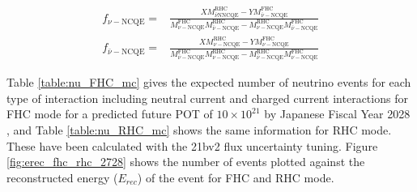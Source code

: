 \begin{equation}
    \begin{aligned}
    f_{\nu-\mathrm{NCQE}}= & \frac{X M_{\bar{\nu} \mathrm{N} \mathrm{NCQE}}^{\mathrm{RHC}}-Y M_{\bar{\nu}-\mathrm{NCQE}}^{\mathrm{FHC}}}{M_{\nu-\mathrm{NCQE}}^{\mathrm{FHC}} M_{\bar{\nu}-\mathrm{NCQE}}^{\mathrm{RHC}}-M_{\nu-\mathrm{NCQE}}^{\mathrm{RHC}} M_{\bar{\nu}-\mathrm{NCQE}}^{\mathrm{FHC}}} \\
    f_{\bar{\nu}-\mathrm{NCQE}}= & \frac{X M_{\nu-\mathrm{NCQE}}^{\mathrm{RHC}}-Y M_{\nu-\mathrm{NCQE}}^{\mathrm{FHC}}}{M_{\bar{\nu}-\mathrm{NCQE}}^{\mathrm{FHC}} M_{\nu-\mathrm{NCQE}}^{\mathrm{RHC}}-M_{\bar{\nu}-\mathrm{NCQE}}^{\mathrm{RHC}} M_{\nu-\mathrm{NCQE}}^{\mathrm{FHC}}}
    \end{aligned}
\label{eq:scale_factor_nu}
\end{equation}


Table \ref{table:nu_FHC_mc} gives the expected number of neutrino events for each type of interaction including neutral current and charged current interactions for FHC mode for a predicted future POT of $10 \times 10^{21}$ by Japanese Fiscal Year 2028 \cite{Abe:2016tii}, and Table \ref{table:nu_RHC_mc} shows the same information for RHC mode. These have been calculated with the 21bv2 flux uncertainty tuning. Figure \ref{fig:erec_fhc_rhc_2728} shows the number of events plotted against the reconstructed energy ($E_{rec}$) of the event for FHC and RHC mode.

